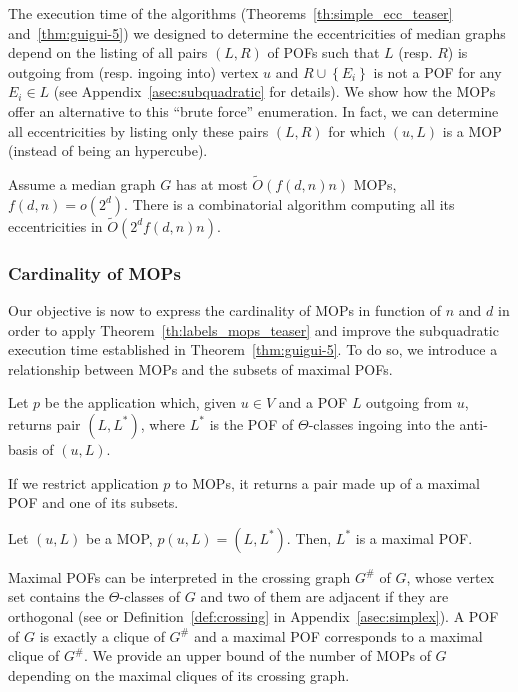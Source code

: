 \documentclass[a4paper,UKenglish,numberwithinsect,cleveref, autoref,anonymous]{lipics-v2021}
\newcommand{\set}[1]{\left\{ #1 \right\}}
\begin{document}
The execution time of the algorithms (Theorems~\ref{th:simple_ecc_teaser} and~\ref{thm:guigui-5}) we designed to determine the eccentricities of median graphs depend on the listing of all pairs $(L,R)$ of POFs such that $L$ (resp. $R$) is outgoing from (resp. ingoing into) vertex $u$ and $R \cup \set{E_i}$ is not a POF for any $E_i \in L$ (see Appendix~\ref{asec:subquadratic} for details). We show how the MOPs offer an alternative to this ``brute force'' enumeration. In fact, we can determine all eccentricities  by listing only these pairs $(L,R)$ for which $(u,L)$ is a MOP (instead of being an hypercube).

\begin{theorem}[\ref{th:labels_mops}]
Assume a median graph $G$ has at most $\tilde{O}(f(d,n)n)$ MOPs, $f(d,n) = o(2^d)$. There is a combinatorial algorithm computing all its eccentricities in $\tilde{O}(2^df(d,n)n)$.
\label{th:labels_mops_teaser}
\end{theorem}

\subsubsection{Cardinality of MOPs} \label{subsubsec:bound_mop}

Our objective is now to express the cardinality of MOPs in function of $n$ and $d$ in order to apply Theorem~\ref{th:labels_mops_teaser} and improve the subquadratic execution time established in Theorem~\ref{thm:guigui-5}. To do so, we introduce a relationship between MOPs and the subsets of maximal POFs.

\begin{definition}
Let $p$ be the application which, given $u \in V$ and a POF $L$ outgoing from $u$, returns pair $(L,L^*)$, where $L^*$ is the POF of $\Theta$-classes ingoing into the anti-basis of $(u,L)$.
\end{definition}

If we restrict application $p$ to MOPs, it returns a pair made up of a maximal POF and one of its subsets.

\begin{lemma}[\ref{le:mop_max_subsets}]
Let $(u,L)$ be a MOP, $p(u,L) = (L,L^*)$. Then, $L^*$ is a maximal POF.
\label{le:mop_max_subsets_teaser}
\end{lemma}

Maximal POFs can be interpreted in the crossing graph $G^{\#}$ of $G$, whose vertex set contains the $\Theta$-classes of $G$ and two of them are adjacent if they are orthogonal (see \cite{KlKo09} or Definition~\ref{def:crossing} in Appendix~\ref{asec:simplex}). A POF of $G$ is exactly a clique of $G^{\#}$ and a maximal POF corresponds to a maximal clique of $G^{\#}$. We provide an upper bound of the number of MOPs of $G$ depending on the maximal cliques of its crossing graph.
\end{document}
